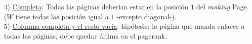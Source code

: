 			4) \underline{Completa}: Todas las páginas deberían estar en la posición $1$ del \textit{ranking} Page. ($W$ tiene todas las posición igual a $1$ -excepto diagonal-).\\

			5) \underline{Columna completa y el resto vacía}: hipótesis: la página que manda enlaces a todas las páginas, debe quedar última en el pagerank.


